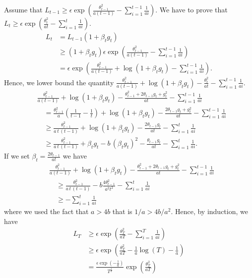 Assume that $L_{t-1}\geq \epsilon \exp(\frac{\theta_{t-1}^2}{a(t-1)}-\sum_{i=1}^{t-1} \frac{1}{a i})$.
We have to prove that $L_{t}\geq \epsilon \exp(\frac{\theta_{t}^2}{a t}-\sum_{i=1}^{t} \frac{1}{a i})$.
\begin{align}
L_{t} &= L_{t-1} (1+\beta_t g_t) \\
&\geq (1+\beta_t g_t) \epsilon \exp(\frac{\theta_{t-1}^2}{a(t-1)}-\sum_{i=1}^{t-1} \frac{1}{a i}) \\
&=  \epsilon \exp(\frac{\theta_{t-1}^2}{a(t-1)}+\log(1+\beta_t g_t)-\sum_{i=1}^{t-1} \frac{1}{a i}).
\end{align}
Hence, we lower bound the quantity $\frac{\theta_{t-1}^2}{a(t-1)}+\log(1+\beta_t g_t) - \frac{\theta_{t}^2}{a t}-\sum_{i=1}^{t-1} \frac{1}{a i}$.
\begin{align}
&\frac{\theta_{t-1}^2}{a(t-1)}+\log(1+\beta_t g_t) -\frac{\theta_{t-1}^2 + 2 \theta_{t-1} g_t +g_t^2}{a t} -\sum_{i=1}^{t-1} \frac{1}{a i}\\ 
& \quad = \frac{\theta_{t-1}^2}{a} (\frac{1}{t-1}-\frac{1}{t}) + \log(1+\beta_t g_t) -\frac{2 \theta_{t-1} g_t +g_t^2}{a t} -\sum_{i=1}^{t-1} \frac{1}{a i}\\
& \quad \geq \frac{\theta_{t-1}^2}{a\,t\,(t-1)} + \log(1+\beta_t g_t) -\frac{2 \theta_{t-1} g_t}{a t} -\sum_{i=1}^{t} \frac{1}{a i}\\
& \quad \geq \frac{\theta_{t-1}^2}{a\,t\,(t-1)} + \beta_t g_t - b \, (\beta_t g_t)^2 -\frac{\theta_{t-1} g_t}{a t} -\sum_{i=1}^{t} \frac{1}{a i}.
\end{align}
If we set $\beta_t=\frac{2 \theta_{t-1}}{a t}$ we have
\begin{align}
&\frac{\theta_{t-1}^2}{a(t-1)}+\log(1+\beta_t g_t) -\frac{\theta_{t-1}^2 + 2 \theta_{t-1} g_t +g_t^2}{a t} -\sum_{i=1}^{t-1} \frac{1}{a i}\\ 
& \quad \geq \frac{\theta_{t-1}^2}{a\,t\,(t-1)}  - b\frac{4\theta_{t-1}^2}{a^2 t^2} -\sum_{i=1}^{t} \frac{1}{a i} \\
& \quad \geq -\sum_{i=1}^{t} \frac{1}{a i}
\end{align}
where we used the fact that $a>4 b$ that is $1/a> 4 b/ a^2$.
Hence, by induction, we have
\begin{align}
L_{T} &\geq \epsilon \exp(\frac{\theta_{T}^2}{a T}-\sum_{i=1}^{T} \frac{1}{a i}) \\
&\geq \epsilon \exp(\frac{\theta_{T}^2}{a T} - \frac{1}{a}\log(T) -\frac{1}{a}) \\
&=\frac{\epsilon \exp(-\frac{1}{a})}{T^\frac{1}{a}}\exp(\frac{\theta_{T}^2}{a T})
\end{align}

